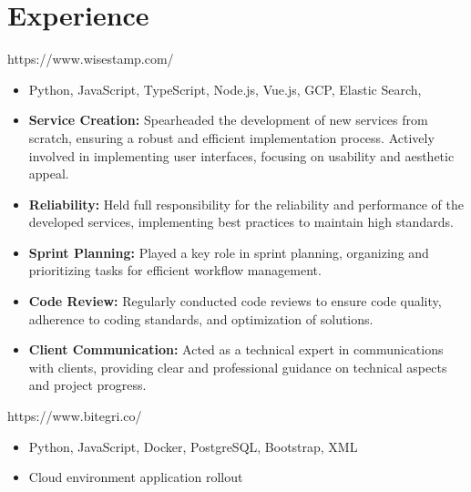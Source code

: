 \documentclass{resume}
\begin{document}



\section{Experience}


https://www.wisestamp.com/
\begin{itemize}
  \item Python, JavaScript, TypeScript, Node.js, Vue.js, GCP, Elastic Search, 
  \item \textbf{Service Creation:} Spearheaded the development of new services from scratch, ensuring a robust and efficient implementation process. Actively involved in implementing user interfaces, focusing on usability and aesthetic appeal.
  \item \textbf{Reliability:} Held full responsibility for the reliability and performance of the developed services, implementing best practices to maintain high standards.
  \item \textbf{Sprint Planning:} Played a key role in sprint planning, organizing and prioritizing tasks for efficient workflow management.
  \item \textbf{Code Review:} Regularly conducted code reviews to ensure code quality, adherence to coding standards, and optimization of solutions.
  \item \textbf{Client Communication: } Acted as a technical expert in communications with clients, providing clear and professional guidance on technical aspects and project progress.
\end{itemize}


https://www.bitegri.co/
\begin{itemize}
  \item Python, JavaScript, Docker, PostgreSQL, Bootstrap, XML
  \item Cloud environment application rollout
  
\end{itemize}

\end{document}
